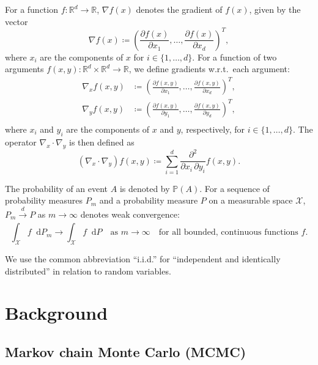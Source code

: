 \documentclass[11pt,a4paper]{report}
\newcommand*\diff{\mathop{}\!\mathrm{d}}
\begin{document}
For a function $f: \mathbb{R}^d \to \mathbb{R}$, $\nabla f(x)$ denotes the gradient of $f(x)$, given by the vector
\begin{equation*}
\nabla f(x) \coloneq \left( \frac{\partial f(x)}{\partial x_1}, \dots, \frac{\partial f(x)}{\partial x_d} \right)^T,
\end{equation*}
where $x_i$ are the components of $x$ for $i \in \{1, \dots, d\}$.
For a function of two arguments $f(x, y): \mathbb{R}^d \times \mathbb{R}^d \to \mathbb{R}$, we define gradients w.r.t.\ each argument:
\begin{equation*}
\begin{aligned}
\nabla_x f(x, y) &\coloneq \left(\frac{\partial f(x, y)}{\partial x_1}, \dots, \frac{\partial f(x, y)}{\partial x_d}\right)^T, \\
\nabla_y f(x, y) &\coloneq \left(\frac{\partial f(x, y)}{\partial y_1}, \dots, \frac{\partial f(x, y)}{\partial y_d}\right)^T, \\
\end{aligned}
\end{equation*}
where $x_i$ and $y_i$ are the components of $x$ and $y$, respectively, for $i \in \{1, \dots, d\}$. The operator $\nabla_x \cdot \nabla_y$ is then defined as
\begin{equation*}
(\nabla_x \cdot \nabla_y) f(x,y) \coloneq \sum_{i=1}^d \frac{\partial^2}{\partial x_i\, \partial y_i} f(x, y).
\end{equation*}

The probability of an event $A$ is denoted by $\mathbb{P}(A)$. For a sequence of probability measures $P_m$ and a probability measure $P$ on a measurable space $\mathcal{X}$, $P_m \xrightarrow[]{d} P$ as $m \to \infty$ denotes weak convergence:
\begin{equation*}
\int_{\mathcal{X}} f \diff P_m \to \int_{\mathcal{X}} f \diff P \quad \text{as } m \to \infty \quad \text{for all bounded, continuous functions } f.
\end{equation*}

We use the common abbreviation ``i.i.d.'' for ``independent and identically distributed'' in relation to random variables.


\chapter{Background}
\label{ch:background}

\section{Markov chain Monte Carlo (MCMC)}
\end{document}
